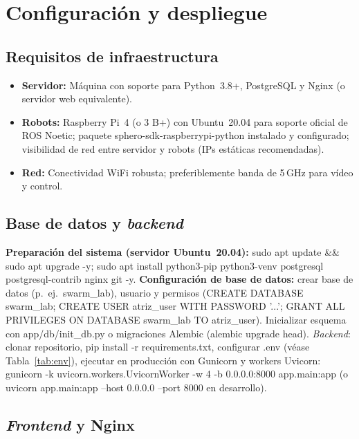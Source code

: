 \documentclass[12pt]{article}
\numberwithin{figure}{section}
\numberwithin{table}{section}
\def\code#1{#1}%
\def\file#1{#1}%
\newcommand{\code}[1]{\textcolor{codeblue}{\url{#1}}}
\newcommand{\file}[1]{\textcolor{darkblue}{\url{#1}}}
\begin{document}
\section{Configuración y despliegue}
\label{sec:config_despliegue}

\subsection{Requisitos de infraestructura}
\begin{itemize}
    \item \textbf{Servidor:} Máquina con soporte para Python~3.8+, PostgreSQL y Nginx (o servidor web equivalente).
    \item \textbf{Robots:} Raspberry Pi~4 (o 3 B+) con Ubuntu~20.04 para soporte oficial de ROS Noetic; paquete \code{sphero-sdk-raspberrypi-python} instalado y configurado; visibilidad de red entre servidor y robots (IPs estáticas recomendadas).
    \item \textbf{Red:} Conectividad WiFi robusta; preferiblemente banda de 5\,GHz para vídeo y control.
\end{itemize}


\subsection{Base de datos y \textit{backend}}

\textbf{Preparación del sistema (servidor Ubuntu~20.04):} \code{sudo apt update \&\& sudo apt upgrade -y}; \code{sudo apt install python3-pip python3-venv postgresql postgresql-contrib nginx git -y}. \textbf{Configuración de base de datos:} crear base de datos (p.\ ej.\ \code{swarm\_lab}), usuario y permisos (\code{CREATE DATABASE swarm\_lab}; \code{CREATE USER atriz\_user WITH PASSWORD '...'}; \code{GRANT ALL PRIVILEGES ON DATABASE swarm\_lab TO atriz\_user}). Inicializar esquema con \file{app/db/init\_db.py} o migraciones Alembic (\code{alembic upgrade head}). \textit{Backend}: clonar repositorio, \code{pip install -r requirements.txt}, configurar \file{.env} (véase Tabla~\ref{tab:env}), ejecutar en producción con Gunicorn y workers Uvicorn: \code{gunicorn -k uvicorn.workers.UvicornWorker -w 4 -b 0.0.0.0:8000 app.main:app} (o \code{uvicorn app.main:app --host 0.0.0.0 --port 8000} en desarrollo).


\subsection{\textit{Frontend} y Nginx}
\end{document}
